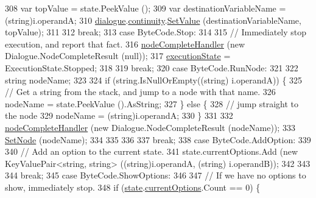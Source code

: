 \begin{DoxyCode}
308                 var topValue = state.PeekValue ();
309                 var destinationVariableName = (string)i.operandA;
310                 \hyperlink{a00136_ac506426c503da5f033247c29e11c5e82}{dialogue}.\hyperlink{a00070_ae94eaa4b03b432422f5d205fabe37ff5}{continuity}.\hyperlink{a00164_aa90ff61224432c5ed3ce72199c55f440}{SetValue} (destinationVariableName, topValue);
311 
312                 \textcolor{keywordflow}{break};
313             \textcolor{keywordflow}{case} ByteCode.Stop:
314 
315                 \textcolor{comment}{// Immediately stop execution, and report that fact.}
316                 \hyperlink{a00136_a5129c63e67e2d4e2780d86b8351320a2}{nodeCompleteHandler} (\textcolor{keyword}{new} Dialogue.NodeCompleteResult (null));
317                 \hyperlink{a00136_a66491da06023dabfb63d09e6ccbba74f}{executionState} = ExecutionState.Stopped;
318 
319                 \textcolor{keywordflow}{break};
320             \textcolor{keywordflow}{case} ByteCode.RunNode:
321 
322                 \textcolor{keywordtype}{string} nodeName;
323 
324                 \textcolor{keywordflow}{if} (\textcolor{keywordtype}{string}.IsNullOrEmpty((\textcolor{keywordtype}{string}) i.operandA)) \{
325                     \textcolor{comment}{// Get a string from the stack, and jump to a node with that name.}
326                      nodeName = state.PeekValue ().AsString;
327                 \} \textcolor{keywordflow}{else} \{
328                     \textcolor{comment}{// jump straight to the node}
329                     nodeName = (string)i.operandA;
330                 \}
331 
332                 \hyperlink{a00136_a5129c63e67e2d4e2780d86b8351320a2}{nodeCompleteHandler} (\textcolor{keyword}{new} Dialogue.NodeCompleteResult (nodeName));
333                 \hyperlink{a00136_a6364593ea1115d65e34b343422cfbbbd}{SetNode} (nodeName);
334 
335 
336 
337                 \textcolor{keywordflow}{break};
338             \textcolor{keywordflow}{case} ByteCode.AddOption:
339 
340                 \textcolor{comment}{// Add an option to the current state.}
341                 state.currentOptions.Add (\textcolor{keyword}{new} KeyValuePair<string, string> ((string)i.operandA, (\textcolor{keywordtype}{string})
      i.operandB));
342 
343 
344                 \textcolor{keywordflow}{break};
345             \textcolor{keywordflow}{case} ByteCode.ShowOptions:
346 
347                 \textcolor{comment}{// If we have no options to show, immediately stop.}
348                 \textcolor{keywordflow}{if} (\hyperlink{a00136_a70f2ce6201cdd2430ceaa764ac614ca0}{state}.\hyperlink{a00139_ab816dfea32ecda23282700f01454e0a9}{currentOptions}.Count == 0) \{

\end{DoxyCode}
